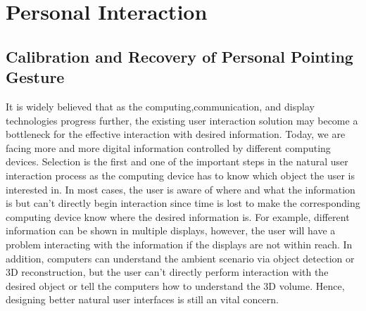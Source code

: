 %
\chapter{Personal Interaction}
\section{Calibration and Recovery of Personal Pointing Gesture}
\label{section:4-PAST}
It is widely believed that as the computing,communication, and display technologies progress further, the existing user interaction solution may become a bottleneck for the effective interaction with desired information. 
Today, we are facing more and more digital information controlled by different computing devices.
Selection is the first and one of the important steps in the natural user interaction process as the computing device has to know which object the user is interested in. In most cases, the user is aware of where and what the information is but can't directly begin interaction since time is lost to make the corresponding computing device know where the desired information is\cite{Swindells2002}. 
For example, different information can be shown in multiple displays, however, the user will have a problem interacting with the information if the displays are not within reach. In addition, computers can understand the ambient scenario via object detection or 3D reconstruction, but the user can't directly perform interaction with the desired object or tell the computers how to understand the 3D volume\cite{export:244725}.
Hence, designing better natural user interfaces is still an vital concern.

